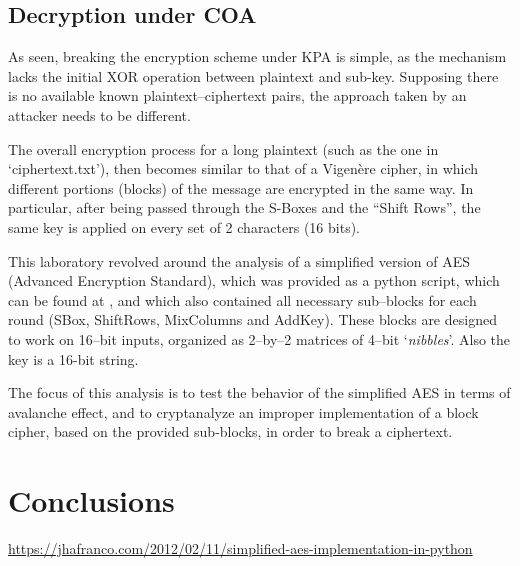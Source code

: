 \documentclass[12pt]{article}
\begin{document}
\subsection{Decryption under COA}
\label{sec:03.1}

As seen, breaking the encryption scheme under KPA is simple, as the mechanism lacks the initial XOR operation between plaintext and sub-key.
Supposing there is no available known plaintext–ciphertext pairs, the approach taken by an attacker needs to be different.

The overall encryption process for a long plaintext (such as the one in `ciphertext.txt'), then becomes similar to that of a Vigenère cipher, in which different portions (blocks) of the message are encrypted in the same way. In particular, after being passed through the S-Boxes and the ``Shift Rows'', the same key is applied on every set of 2 characters (16 bits).

This laboratory revolved around the analysis of a simplified version of AES (Advanced Encryption Standard), which was provided as a python script, which can be found at \cite{Original Python implementation}, and which also contained all necessary sub–blocks for each round (SBox, ShiftRows, MixColumns and AddKey).
These blocks are designed to work on 16–bit inputs, organized as 2–by–2 matrices of 4–bit `\textit{nibbles}'. Also the key is a 16-bit string.

The focus of this analysis is to test the behavior of the simplified AES in terms of avalanche effect, and to cryptanalyze an improper implementation of a block cipher, based on the provided sub-blocks, in order to break a ciphertext.


\section{Conclusions}
\label{sec:04}

\begin{thebibliography}{5}
    \url{https://jhafranco.com/2012/02/11/simplified-aes-implementation-in-python}
\end{thebibliography}
\end{document}
